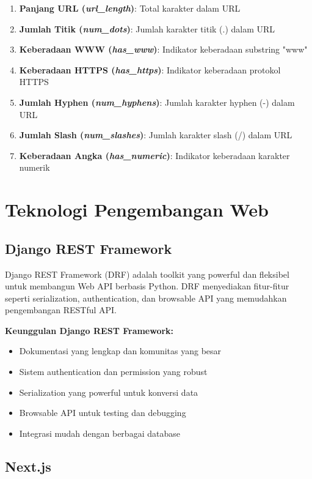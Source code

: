 \begin{enumerate}
    \item \textbf{Panjang URL (\textit{url\_length})}: Total karakter dalam URL
    \item \textbf{Jumlah Titik (\textit{num\_dots})}: Jumlah karakter titik (.) dalam URL
    \item \textbf{Keberadaan WWW (\textit{has\_www})}: Indikator keberadaan substring "www"
    \item \textbf{Keberadaan HTTPS (\textit{has\_https})}: Indikator keberadaan protokol HTTPS
    \item \textbf{Jumlah Hyphen (\textit{num\_hyphens})}: Jumlah karakter hyphen (-) dalam URL
    \item \textbf{Jumlah Slash (\textit{num\_slashes})}: Jumlah karakter slash (/) dalam URL
    \item \textbf{Keberadaan Angka (\textit{has\_numeric})}: Indikator keberadaan karakter numerik
\end{enumerate}

\section{Teknologi Pengembangan Web}

\subsection{Django REST Framework}

Django REST Framework (DRF) adalah toolkit yang powerful dan fleksibel untuk membangun Web API berbasis Python. DRF menyediakan fitur-fitur seperti serialization, authentication, dan browsable API yang memudahkan pengembangan RESTful API.

\textbf{Keunggulan Django REST Framework:}
\begin{itemize}
    \item Dokumentasi yang lengkap dan komunitas yang besar
    \item Sistem authentication dan permission yang robust
    \item Serialization yang powerful untuk konversi data
    \item Browsable API untuk testing dan debugging
    \item Integrasi mudah dengan berbagai database
\end{itemize}

\subsection{Next.js}

